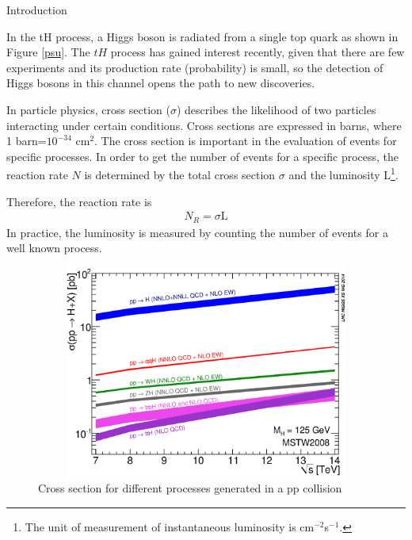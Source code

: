 \begin{chapter}{Introduction}

In the tH process, a Higgs boson is radiated from a single top quark as shown in Figure \ref{psu}. The $tH$ process has gained interest recently\cite{th1}, given that there are few experiments and its production rate (probability) is small, so the detection of Higgs bosons in this channel opens the path to new discoveries.

In particle physics, cross section ($\sigma$) describes the likelihood of two particles interacting under certain conditions.
 Cross sections are expressed in barns, where 1 barn=$10^{-34}$ cm$^{2}$.
The cross section is important in the evaluation of events for specific processes. In order to get the number of events for a specific process, the reaction rate $N$ is determined by the total cross section $\sigma$ and the luminosity L\footnote{The unit of measurement of instantaneous luminosity is cm$^{-2}$s$^{-1}$. }.

Therefore, the reaction rate is 
\begin{align} \label{nr}
N_R=\sigma \text{L}
\end{align}
In practice, the luminosity is measured by counting the number of events for a well known process.
\begin{figure}[ht]
	\centering%
	\includegraphics[width=12cm,height=7cm]{Chapter1/7-14xsec.eps}
	\caption[Cross section for different processes generated in a pp collision]{
		Cross section for different processes generated in a pp collision  \cite{dcrosse}}
	\label{csp}
\end{figure}


\end{chapter}
